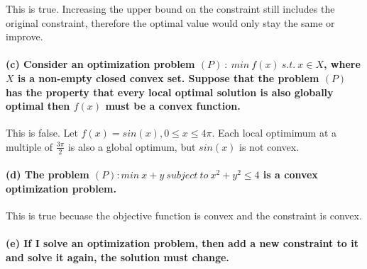 \documentclass[11pt]{article}
\begin{document}
This is true. Increasing the upper bound on the constraint still
includes the original constraint, therefore the optimal value would only
stay the same or improve.

\hypertarget{c-consider-an-optimization-problem-p-min-fx-s.t.-x-in-x-where-x-is-a-non-empty-closed-convex-set.-suppose-that-the-problem-p-has-the-property-that-every-local-optimal-solution-is-also-globally-optimal-then-fx-must-be-a-convex-function.}{%
\paragraph{\texorpdfstring{(c) Consider an optimization problem
\((P) \ : \ min \ f(x) \ s.t. \ x \in X\), where \(X\) is a non-empty
closed convex set. Suppose that the problem \((P)\) has the property
that every local optimal solution is also globally optimal then \(f(x)\)
must be a convex
function.}{(c) Consider an optimization problem (P) \textbackslash{} : \textbackslash{} min \textbackslash{} f(x) \textbackslash{} s.t. \textbackslash{} x \textbackslash{}in X, where X is a non-empty closed convex set. Suppose that the problem (P) has the property that every local optimal solution is also globally optimal then f(x) must be a convex function.}}\label{c-consider-an-optimization-problem-p-min-fx-s.t.-x-in-x-where-x-is-a-non-empty-closed-convex-set.-suppose-that-the-problem-p-has-the-property-that-every-local-optimal-solution-is-also-globally-optimal-then-fx-must-be-a-convex-function.}}

This is false. Let \(f(x) = sin(x), 0 \le x \le 4\pi\). Each local
optimimum at a multiple of \(\frac{3\pi}{2}\) is also a global optimum,
but \(sin(x)\) is not convex.

\hypertarget{d-the-problem-p-min-x-y-subject-to-x2-y2-le-4-is-a-convex-optimization-problem.}{%
\paragraph{\texorpdfstring{(d) The problem
\((P): min \ x + y \ subject \ to \ x^2 + y^2 \le 4\) is a convex
optimization
problem.}{(d) The problem (P): min \textbackslash{} x + y \textbackslash{} subject \textbackslash{} to \textbackslash{} x\^{}2 + y\^{}2 \textbackslash{}le 4 is a convex optimization problem.}}\label{d-the-problem-p-min-x-y-subject-to-x2-y2-le-4-is-a-convex-optimization-problem.}}

This is true becuase the objective function is convex and the constraint
is convex.

\hypertarget{e-if-i-solve-an-optimization-problem-then-add-a-new-constraint-to-it-and-solve-it-again-the-solution-must-change.}{%
\paragraph{(e) If I solve an optimization problem, then add a new
constraint to it and solve it again, the solution must
change.}\label{e-if-i-solve-an-optimization-problem-then-add-a-new-constraint-to-it-and-solve-it-again-the-solution-must-change.}}
\end{document}
